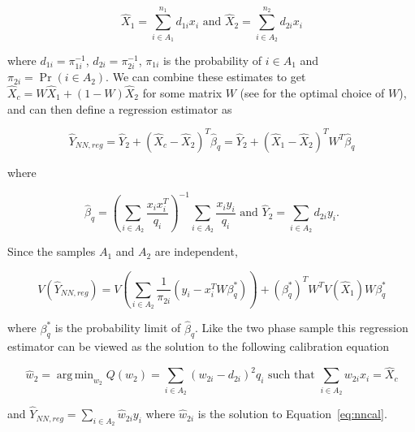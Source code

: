 \documentclass[12pt]{article}
\DeclareMathOperator*{\argmin}{arg\,min}
\begin{document}
$$\hat X_1 = \sum_{i \in A_1}^{n_1} d_{1i} x_i \text{ and } 
\hat X_2 = \sum_{i \in A_2}^{n_2} d_{2i} x_i $$

where $d_{1i} = \pi_{1i}^{-1}$, $d_{2i} = \pi_{2i}^{-1}$, $\pi_{1i}$ is the
probability of $i \in A_1$ and $\pi_{2i} = \Pr(i \in A_2)$. 
We can combine these estimates to get
$\hat X_c = W \hat X_1 + (1 - W)\hat X_2$ for some matrix $W$ (see
\cite{merkouris2004combining} for the optimal choice of $W$), and can then define
a regression estimator as

$$
\hat Y_{NN, reg} = \hat Y_2 + (\hat X_c - \hat X_2)^T \hat \beta_q = 
\hat Y_2 + (\hat X_1 - \hat X_2)^T W^T\hat \beta_q 
$$

where %

$$\hat \beta_q = \left(\sum_{i \in A_2} \frac{x_i x_i^T}{q_i}\right)^{-1}
\sum_{i \in A_2} \frac{x_i y_i}{q_i} \text{ and }\hat Y_2 = \sum_{i \in A_2}
d_{2i} y_i. $$

Since the samples $A_1$ and $A_2$ are independent, 

$$V(\hat Y_{NN, reg}) = V\left(\sum_{i \in A_2} \frac{1}{\pi_{2i}}(y_i -
x_i^TW\beta^*_q)\right) + (\beta^*_q)^T W^T V(\hat X_1) W \beta_q^*$$

where $\beta_q^*$ is the probability limit of $\hat \beta_q$. Like the two phase
sample this regression estimator can be viewed as the solution to the following
calibration equation 

\begin{equation}\label{eq:nncal}
  \hat w_2 = \argmin_{w_2} Q(w_2) = \sum_{i \in A_2} (w_{2i} - d_{2i})^2 q_i 
  \text{ such that } \sum_{i \in A_2} w_{2i} x_i = \hat X_c
\end{equation}

and $\hat Y_{NN, reg} = \sum_{i \in A_2} \hat w_{2i} y_i$ where $\hat
w_{2i}$ is the solution to Equation~\ref{eq:nncal}.
\end{document}
